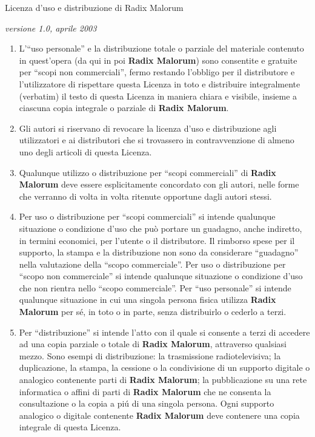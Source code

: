 \documentclass[10pt,italian,onecolumn,twoside,xdvi,openany,a4paper]{book}
\begin{document}
      {\large Licenza d'uso e distribuzione di Radix Malorum}

      \textit{versione 1.0, aprile 2003}
\footnotesize

      \begin{enumerate} \item L'``uso personale'' e la distribuzione
      totale o parziale del materiale contenuto in quest'opera (da qui
      in poi {\bf Radix Malorum}) sono consentite e gratuite per
      ``scopi non commerciali'', fermo restando l'obbligo per il
      distributore e l'utilizzatore di rispettare questa Licenza in
      toto e distribuire integralmente ({\rm verbatim}) il testo di
      questa Licenza in maniera chiara e visibile, insieme a ciascuna
      copia integrale o parziale di {\bf Radix Malorum}.

      \item Gli autori si riservano di revocare la licenza d'uso e
      distribuzione agli utilizzatori e ai distributori che si
      trovassero in contravvenzione di almeno uno degli articoli di
      questa Licenza.

      \item Qualunque utilizzo o distribuzione per ``scopi
      commerciali'' di {\bf Radix Malorum} deve essere esplicitamente
      concordato con gli autori, nelle forme che verranno di volta in
      volta ritenute opportune dagli autori stessi.

      \item Per uso o distribuzione per ``scopi commerciali'' si
      intende qualunque situazione o condizione d'uso che pu\`o
      portare un guadagno, anche indiretto, in termini economici, per
      l'utente o il distributore. Il rimborso spese per il supporto,
      la stampa e la distribuzione non sono da considerare
      ``guadagno'' nella valutazione della ``scopo commerciale''. Per
      uso o distribuzione per ``scopo non commerciale'' si intende
      qualunque situazione o condizione d'uso che non rientra nello
      ``scopo commerciale''. Per ``uso personale'' si intende
      qualunque situazione in cui una singola persona fisica utilizza
      {\bf Radix Malorum} per s\'e, in toto o in parte, senza
      distribuirlo o cederlo a terzi.

      \item Per ``distribuzione'' si intende l'atto con il quale si
      consente a terzi di accedere ad una copia parziale o totale di
      {\bf Radix Malorum}, attraverso qualsiasi mezzo. Sono esempi di
      distribuzione: la trasmissione radiotelevisiva; la duplicazione,
      la stampa, la cessione o la condivisione di un supporto digitale
      o analogico contenente parti di {\bf Radix Malorum}; la
      pubblicazione su una rete informatica o affini di parti di {\bf
      Radix Malorum} che ne consenta la consultazione o la copia a
      pi\'u di una singola persona. Ogni supporto analogico o digitale
      contenente {\bf Radix Malorum} deve contenere una copia
      integrale di questa Licenza.


\end{enumerate}
\end{document}
